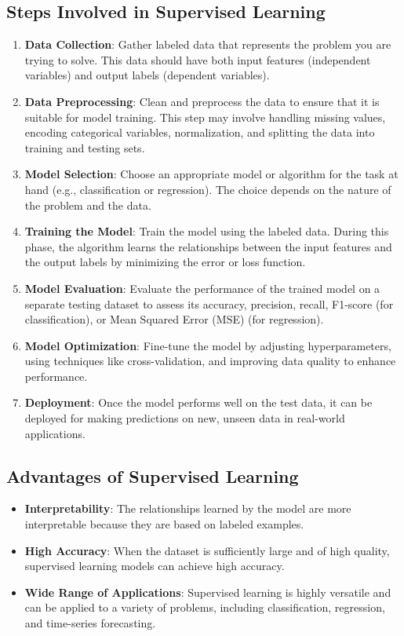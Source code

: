 \subsection*{Steps Involved in Supervised Learning}

\begin{enumerate}
    \item \textbf{Data Collection}:
    Gather labeled data that represents the problem you are trying to solve. This data should have both input features (independent variables) and output labels (dependent variables).
    \item \textbf{Data Preprocessing}:
    Clean and preprocess the data to ensure that it is suitable for model training. This step may involve handling missing values, encoding categorical variables, normalization, and splitting the data into training and testing sets.
    \item \textbf{Model Selection}:
    Choose an appropriate model or algorithm for the task at hand (e.g., classification or regression). The choice depends on the nature of the problem and the data.
    \item \textbf{Training the Model}:
    Train the model using the labeled data. During this phase, the algorithm learns the relationships between the input features and the output labels by minimizing the error or loss function.
    \item \textbf{Model Evaluation}:
    Evaluate the performance of the trained model on a separate testing dataset to assess its accuracy, precision, recall, F1-score (for classification), or Mean Squared Error (MSE) (for regression).
    \item \textbf{Model Optimization}:
    Fine-tune the model by adjusting hyperparameters, using techniques like cross-validation, and improving data quality to enhance performance.
    \item \textbf{Deployment}:
    Once the model performs well on the test data, it can be deployed for making predictions on new, unseen data in real-world applications.
\end{enumerate}

\subsection*{Advantages of Supervised Learning}

\begin{itemize}
    \item \textbf{Interpretability}:
    The relationships learned by the model are more interpretable because they are based on labeled examples.
    \item \textbf{High Accuracy}:
    When the dataset is sufficiently large and of high quality, supervised learning models can achieve high accuracy.
    \item \textbf{Wide Range of Applications}:
    Supervised learning is highly versatile and can be applied to a variety of problems, including classification, regression, and time-series forecasting.
\end{itemize}

